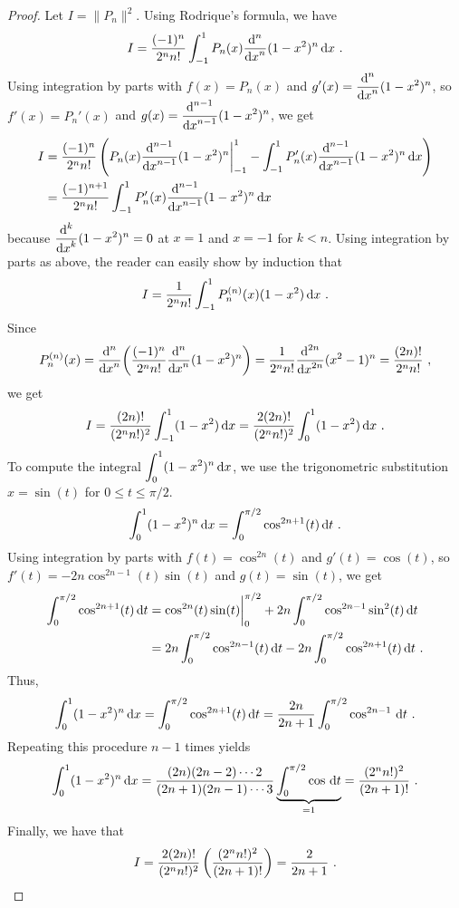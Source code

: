 \begin{proof}
Let $\displaystyle I = \| P_n\|^2$.  Using Rodrique's formula, we have
\[
I = \frac{(-1)^n}{2^n n!} \int_{-1}^1 P_n(x) \dfdxn{(1-x^2)^n}{x}{n} \dx{x} \ .
\]
Using integration by parts with $f(x) = P_n(x)$ and
$\displaystyle g'(x) = \dfdxn{(1-x^2)^n}{x}{n}$, so
$f'(x) = P_n'(x)$ and
$\displaystyle g(x) = \dfdxn{(1-x^2)^n}{x}{n-1}$, we get
\begin{align*}
I &= \frac{(-1)^n}{2^n n!} \left( P_n(x) \dfdxn{(1-x^2)^n}{x}{n-1}\bigg|_{-1}^1 
- \int_{-1}^1 P_n'(x) \dfdxn{(1-x^2)^n}{x}{n-1} \dx{x} \right) \\
&= \frac{(-1)^{n+1}}{2^n n!}
 \int_{-1}^1 P_n'(x) \dfdxn{(1-x^2)^n}{x}{n-1} \dx{x}
\end{align*}
because $\displaystyle \dfdxn{(1-x^2)^n}{x}{k} = 0$ at $x=1$ and
$x=-1$ for $k<n$.  Using integration by parts as above, the reader
can easily show by induction that
\[
I = \frac{1}{2^n n!} \int_{-1}^1 P_n^{(n)}(x) (1-x^2) \dx{x} \ .
\]
Since
\[
P_n^{(n)}(x) = \dfdxn{
\left( \frac{(-1)^n}{2^n n!} \dfdxn{(1-x^2)^n}{x}{n}\right)}{x}{n}
= \frac{1}{2^n n!} \dfdxn{(x^2-1)^n}{x}{2n} = \frac{(2n)!}{2^n n!} \ ,
\]
we get
\[
I = \frac{(2n)!}{(2^n n!)^2} \int_{-1}^1 (1-x^2) \dx{x}
= \frac{2(2n)!}{(2^n n!)^2} \int_0^1 (1-x^2) \dx{x} \ .
\]
To compute the integral $\displaystyle \int_0^1 (1-x^2)^n \dx{x}$, we
use the trigonometric substitution $x=\sin(t)$ for
$0 \leq t \leq \pi/2$.
\[
\int_0^1 (1-x^2)^n \dx{x} = \int_0^{\pi/2} \cos^{2n+1}(t) \dx{t} \ .
\]
Using integration by parts with $f(t) = \cos^{2n}(t)$ and
$g'(t) = \cos(t)$, so\\
$f'(t) = -2n \cos^{2n-1}(t)\sin(t)$ and
$g(t) = \sin(t)$, we get
\begin{align*}
\int_0^{\pi/2} \cos^{2n+1}(t) \dx{t} &= \cos^{2n}(t)\sin(t)\bigg|_0^{\pi/2}
+ 2n \int_0^{\pi/2} \cos^{2n-1}\sin^2(t)\dx{t} \\
&= 2n \int_0^{\pi/2} \cos^{2n-1}(t) \dx{t} - 2n \int_0^{\pi/2}
\cos^{2n+1}(t) \dx{t} \ .
\end{align*}
Thus,
\[
\int_0^1 (1-x^2)^n \dx{x} = \int_0^{\pi/2} \cos^{2n+1}(t) \dx{t}
= \frac{2n}{2n+1} \int_0^{\pi/2} \cos^{2n-1}\dx{t} \ .
\]
Repeating this procedure $n-1$ times yields
\[
\int_0^1 (1-x^2)^n \dx{x}
= \frac{(2n)(2n-2)\cdots 2}{(2n+1)(2n-1)\cdots 3}
\underbrace{\int_0^{\pi/2} \cos\dx{t}}_{=1} = \frac{(2^n n!)^2}{(2n+1)!} \ .
\]
Finally, we have that
\[
I = \frac{2(2n)!}{(2^n n!)^2} \left( \frac{(2^n n!)^2}{(2n+1)!} \right)
= \frac{2}{2n+1} \ .    \qedhere
\]
\end{proof}

